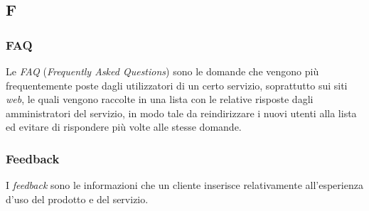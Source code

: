 \subsection{F}

\subsubsection{FAQ}
Le \textit{FAQ} (\textit{Frequently Asked Questions}) sono le domande che vengono più frequentemente poste dagli utilizzatori di un certo servizio, soprattutto sui siti \textit{web},
le quali vengono raccolte in una lista con le relative risposte dagli amministratori del servizio, in modo tale da reindirizzare i nuovi utenti alla lista ed evitare di rispondere più volte alle stesse domande.

\subsubsection{Feedback}
I \textit{feedback} sono le informazioni che un cliente inserisce relativamente
all'esperienza d'uso del prodotto e del servizio.

\newpage

